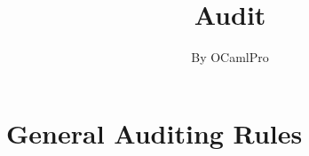\documentclass{report}
\newif\ifsolissues
\newif\ifsoldraft
\begin{document}
\title{Audit}
\author{By OCamlPro}
\maketitle
\dominitoc
\ifsolissues
\listoffigures
\fi
\tableofcontents

\ifsoldraft
\chapter{Only for Auditors}

\section{To edit this documents}

In the report.tex file, choose:
\begin{itemize}
\item{\bf \textbackslash{}soldraftfalse} to remove draft mode (watermarks, advises)
\item{\bf \textbackslash{}solmodulestrue} to display modules by chapter instead of contracts
\item{\bf \textbackslash{}soltablestrue} to display tables for parameters and returns
\item{\bf \textbackslash{}solissuesfalse} to remove the table of issues
\end{itemize}

Issues can be entered with:
\begin{itemize}
\item{\bf \textbackslash{}issueCritical\{title\}\{text\}}
\item{\bf \textbackslash{}issueMajor\{title\}\{text\}}
\item{\bf \textbackslash{}issueMinor\{title\}\{text\}}
\end{itemize}
\fi

\section{General Auditing Rules}
\end{document}
